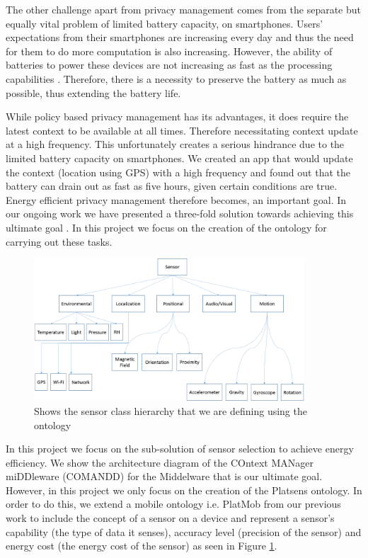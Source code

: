 \documentclass{ubicomp2013}
\begin{document}
The other challenge apart from privacy management comes from the separate but equally vital problem of limited battery capacity, on smartphones. Users' expectations from their smartphones are increasing every day and thus the need for them to do more computation is also increasing. However, the ability of batteries to power these devices are not increasing as fast as the processing capabilities \cite{boxall2012battery}. Therefore, there is a necessity to preserve the battery as much as possible, thus extending the battery life.

While policy based privacy management has its advantages, it does require the latest context to be available at all times. Therefore necessitating context update at a high frequency. This unfortunately creates a serious hindrance due to the limited battery capacity on smartphones. We created an app that would update the context (location using GPS) with a high frequency and found out that the battery can drain out as fast as five hours, given certain conditions are true. Energy efficient privacy management therefore becomes, an important goal. In our ongoing work we have presented a three-fold solution towards achieving this ultimate goal \cite{das2012energy}. In this project we focus on the creation of the ontology for carrying out these tasks.

\begin{figure}[tbh]
\centering
\includegraphics[width=0.9\textwidth]{Sensor_Class_Hierarchy.png}
\caption{Shows the sensor class hierarchy that we are defining using the ontology}
\label{fig:hierarchy}
\end{figure}

In this project we focus on the sub-solution of sensor selection to achieve energy efficiency. We show the architecture diagram of the COntext MANager miDDleware (COMANDD) for the Middelware that is our ultimate goal. However, in this project we only focus on the creation of the Platsens ontology. In order to do this, we extend a mobile ontology i.e. PlatMob \cite{ghosh2012privacy,ghosh2012ms} from our previous work to include the concept of a sensor on a device and represent a sensor's capability (the type of data it senses), accuracy level (precision of the sensor) and energy cost (the energy cost of the sensor) as seen in Figure \ref{fig:hierarchy}.
  
\end{document}
